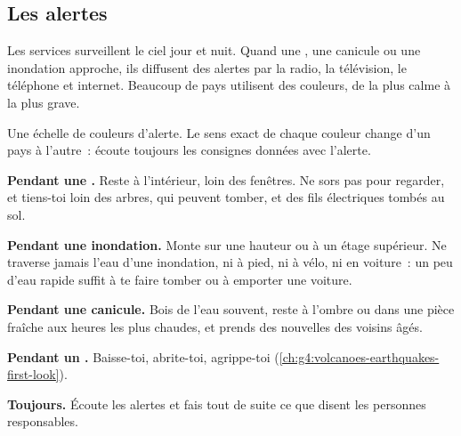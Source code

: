 \subsection*{Les alertes}

Les services  surveillent le ciel jour et nuit. Quand une
, une canicule ou une inondation approche, ils diffusent des alertes
par la radio, la télévision, le téléphone et internet. Beaucoup de pays
utilisent des couleurs, de la plus calme à la plus grave.

\begin{omfigure}

{\small Une échelle de couleurs d'alerte. Le sens exact de chaque couleur
change d'un pays à l'autre~: écoute toujours les consignes données avec
l'alerte.}
\end{omfigure}

\begin{safety}
\textbf{Pendant une .} Reste à l'intérieur, loin des fenêtres. Ne
sors pas pour regarder, et tiens-toi loin des arbres, qui peuvent tomber,
et des fils électriques tombés au sol.

\textbf{Pendant une inondation.} Monte sur une hauteur ou à un étage
supérieur. Ne traverse jamais l'eau d'une inondation, ni à pied, ni à vélo,
ni en voiture~: un peu d'eau rapide suffit à te faire tomber ou à emporter
une voiture.

\textbf{Pendant une canicule.} Bois de l'eau souvent, reste à l'ombre ou
dans une pièce fraîche aux heures les plus chaudes, et prends des nouvelles
des voisins âgés.

\textbf{Pendant un .} Baisse-toi, abrite-toi, agrippe-toi
(\cref{ch:g4:volcanoes-earthquakes-first-look}).

\textbf{Toujours.} Écoute les alertes et fais tout de suite ce que disent
les personnes responsables.
\end{safety}

